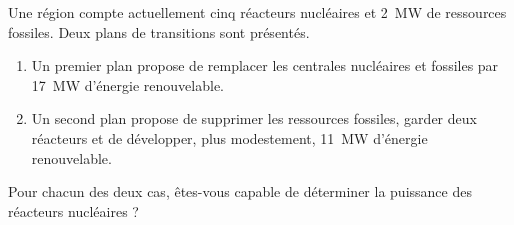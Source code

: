 
\begin{exercice}\label{exo2smath-0286}


Une région compte actuellement cinq réacteurs nucléaires et \SI{2}{\mega\watt} de ressources fossiles. Deux plans de transitions sont présentés.
\begin{enumerate}
    \item
        Un premier plan propose de remplacer les centrales nucléaires et fossiles par \SI{17}{\mega\watt} d'énergie renouvelable.
    \item
        Un second plan propose de supprimer les ressources fossiles, garder deux réacteurs et de développer, plus modestement, \SI{11}{\mega\watt} d'énergie renouvelable.
\end{enumerate}

Pour chacun des deux cas, êtes-vous capable de déterminer la puissance des réacteurs nucléaires ?

\end{exercice}
